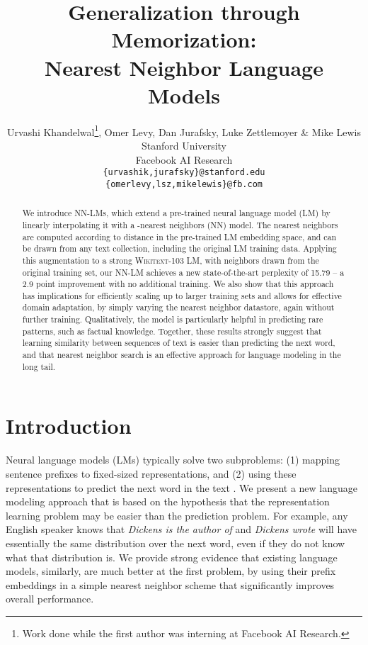 \documentclass{article} \usepackage{iclr2020_conference,times}
\title{Generalization through Memorization: \\ Nearest Neighbor Language Models}
\author{
Urvashi Khandelwal\thanks{Work done while the first author was interning at Facebook AI Research.}, Omer Levy, Dan Jurafsky, Luke Zettlemoyer \& Mike Lewis\\
Stanford University\\
Facebook AI Research\\
 {\tt \{urvashik,jurafsky\}@stanford.edu}\\
  {\tt \{omerlevy,lsz,mikelewis\}@fb.com}
}
\begin{document}
\maketitle

\begin{abstract}
We introduce NN-LMs, which extend a pre-trained neural language model (LM) by linearly interpolating it with a -nearest neighbors (NN) model. 
The nearest neighbors are computed according to distance in the pre-trained LM embedding space, and can be drawn from any text collection, including the original LM training data. 
Applying this augmentation to a strong \textsc{Wikitext-103} LM, with neighbors drawn from the original training set, our NN-LM achieves a new state-of-the-art perplexity of 15.79 -- a 2.9 point improvement with no additional training. 
We also show that this approach has implications for efficiently scaling up to larger training sets and allows for effective domain adaptation, by simply varying the nearest neighbor datastore, again without further training. 
Qualitatively, the model is particularly helpful in predicting rare patterns, such as factual knowledge.
Together, these results strongly suggest that learning similarity between sequences of text
is easier than predicting the next word, and that nearest neighbor search is an effective approach for language modeling in the long tail.

 \end{abstract}



\section{Introduction}
\label{sec:intro}

Neural language models (LMs) typically solve two subproblems: (1) mapping sentence prefixes to fixed-sized representations, and (2) using these representations to predict the next word in the text \citep{bengio2003neural,mikolov2010recurrent}. 
We present a new language modeling approach that is based on the hypothesis that the representation learning problem may be easier than the prediction problem.
For example, any English speaker knows that \emph{Dickens is the author of} and \emph{Dickens wrote} will have essentially the same distribution over the next word, even if they do not know what that distribution is.
We provide strong evidence that existing language models, similarly, are much better at the first problem, by using their prefix embeddings in a simple nearest neighbor scheme that significantly improves overall  performance. 
\end{document}

